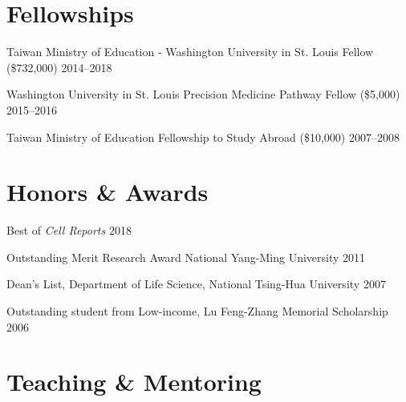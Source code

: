 \documentclass[letterpaper,11pt]{cv}
\begin{document}
\section{Fellowships}

\begin{entrylist}
\item Taiwan Ministry of Education - Washington University in St. Louis Fellow (\$732,000) \hfill 2014--2018
\item Washington University in St. Louis Precision Medicine Pathway Fellow (\$5,000)  \hfill 2015--2016
\item Taiwan Ministry of Education Fellowship to Study Abroad (\$10,000) \hfill 2007--2008
\end{entrylist}

\section{Honors \& Awards}

\begin{detaillist}
\item 
\item Best of \textit{Cell Reports}
    \hfill 2018

\item Outstanding Merit Research Award National Yang-Ming University
    \hfill 2011

\item Dean's List, Department of Life Science, National Tsing-Hua University
    \hfill 2007

\item Outstanding student from Low-income, Lu Feng-Zhang Memorial Scholarship
    \hfill
    2006

\end{detaillist}


\section{Teaching \& Mentoring}
\end{document}
